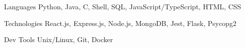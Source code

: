 \begin{cvskills}
    \cvskill
        {Languages} %
        {Python, Java, C, Shell, SQL, JavaScript/TypeScript, HTML, CSS} %
    
    \cvskill
        {Technologies} %
        {React.js, Express.js, Node.js, MongoDB, Jest, Flask, Psycopg2} %
    
    \cvskill
        {Dev Tools} %
        {Unix/Linux, Git, Docker} %
\end{cvskills}